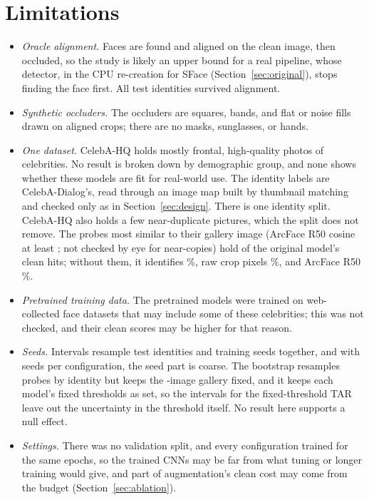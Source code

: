 \section{Limitations}\label{sec:limitations}

\begin{itemize}
\item \textit{Oracle alignment.} Faces are found and aligned on the clean image, then occluded, so the study is likely an upper bound for a real pipeline, whose detector, in the CPU re-creation for SFace (Section~\ref{sec:original}), stops finding the face first. All  test identities survived alignment.
\item \textit{Synthetic occluders.} The occluders are squares, bands, and flat or noise fills drawn on aligned crops; there are no masks, sunglasses, or hands.
\item \textit{One dataset.} CelebA-HQ holds mostly frontal, high-quality photos of celebrities. No result is broken down by demographic group, and none shows whether these models are fit for real-world use. The identity labels are CelebA-Dialog's, read through an image map built by thumbnail matching and checked only as in Section~\ref{sec:design}. There is one identity split. CelebA-HQ also holds a few near-duplicate pictures, which the split does not remove. The  probes most similar to their gallery image (ArcFace R50 cosine at least ; not checked by eye for near-copies) hold  of the original model's  clean hits; without them, it identifies \%, raw crop pixels \%, and ArcFace R50 \%.
\item \textit{Pretrained training data.} The pretrained models were trained on web-collected face datasets that may include some of these celebrities; this was not checked, and their clean scores may be higher for that reason.
\item \textit{Seeds.} Intervals resample test identities and training seeds together, and with  seeds per configuration, the seed part is coarse. The bootstrap resamples probes by identity but keeps the -image gallery fixed, and it keeps each model's fixed thresholds as set, so the intervals for the fixed-threshold TAR leave out the uncertainty in the threshold itself. No result here supports a null effect.
\item \textit{Settings.} There was no validation split, and every configuration trained for the same  epochs, so the trained CNNs may be far from what tuning or longer training would give, and part of augmentation's clean cost may come from the budget (Section~\ref{sec:ablation}).

\end{itemize}
